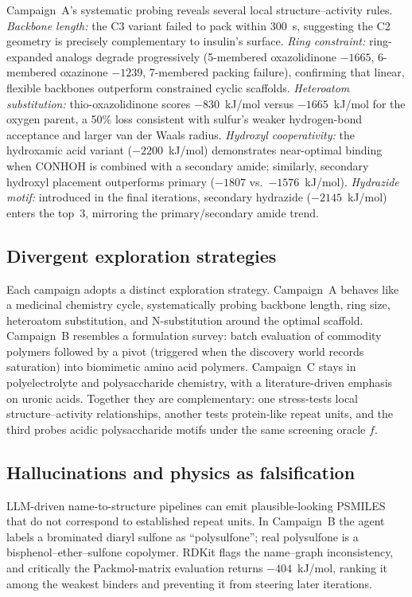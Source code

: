 \documentclass[twocolumn]{fairmeta}
\begin{document}
Campaign~A's systematic probing reveals several local structure--activity rules.
\emph{Backbone length:} the C3 variant failed to pack within 300~s, suggesting the C2 geometry is precisely complementary to insulin's surface.
\emph{Ring constraint:} ring-expanded analogs degrade progressively (5-membered oxazolidinone $-1665$, 6-membered oxazinone $-1239$, 7-membered packing failure), confirming that linear, flexible backbones outperform constrained cyclic scaffolds.
\emph{Heteroatom substitution:} thio-oxazolidinone scores $-830$~kJ/mol versus $-1665$~kJ/mol for the oxygen parent, a 50\% loss consistent with sulfur's weaker hydrogen-bond acceptance and larger van der Waals radius.
\emph{Hydroxyl cooperativity:} the hydroxamic acid variant ($-2200$~kJ/mol) demonstrates near-optimal binding when CONHOH is combined with a secondary amide; similarly, secondary hydroxyl placement outperforms primary ($-1807$ vs.\ $-1576$~kJ/mol).
\emph{Hydrazide motif:} introduced in the final iterations, secondary hydrazide ($-2145$~kJ/mol) enters the top~3, mirroring the primary/secondary amide trend.

\subsection{Divergent exploration strategies}

Each campaign adopts a distinct exploration strategy.
Campaign~A behaves like a medicinal chemistry cycle, systematically probing backbone length, ring size, heteroatom substitution, and N-substitution around the optimal scaffold.
Campaign~B resembles a formulation survey: batch evaluation of commodity polymers followed by a pivot (triggered when the discovery world records saturation) into biomimetic amino acid polymers.
Campaign~C stays in polyelectrolyte and polysaccharide chemistry, with a literature-driven emphasis on uronic acids.
Together they are complementary: one stress-tests local structure--activity relationships, another tests protein-like repeat units, and the third probes acidic polysaccharide motifs under the same screening oracle $f$.

\subsection{Hallucinations and physics as falsification}

LLM-driven name-to-structure pipelines can emit plausible-looking PSMILES that do not correspond to established repeat units.
In Campaign~B the agent labels a brominated diaryl sulfone as ``polysulfone''; real polysulfone is a bisphenol--ether--sulfone copolymer.
RDKit flags the name--graph inconsistency, and critically the Packmol-matrix evaluation returns $-404$~kJ/mol, ranking it among the weakest binders and preventing it from steering later iterations.
\end{document}
